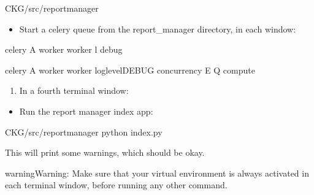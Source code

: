 \documentclass[letterpaper,10pt,english]{sphinxmanual}
\begin{document}
\begin{sphinxVerbatim}[commandchars=\\\{\}]
\PYGZdl{}  CKG/src/report\PYGZus{}manager
\end{sphinxVerbatim}
\begin{itemize}
\item {} 
Start a celery queue from the report\_manager directory, in each window:

\end{itemize}


\begin{sphinxVerbatim}[commandchars=\\\{\}]
\PYGZdl{} celery \PYGZhy{}A worker worker \PYGZhy{}l debug
\end{sphinxVerbatim}


\begin{sphinxVerbatim}[commandchars=\\\{\}]
\PYGZdl{} celery \PYGZhy{}A worker worker \PYGZhy{}\PYGZhy{}loglevelDEBUG \PYGZhy{}\PYGZhy{}concurrency \PYGZhy{}E \PYGZhy{}Q compute
\end{sphinxVerbatim}
\begin{enumerate}
%
\setcounter{enumi}{2}
\item {} 
In a fourth terminal window:

\end{enumerate}
\begin{itemize}
\item {} 
Run the report manager index app:

\end{itemize}

\begin{sphinxVerbatim}[commandchars=\\\{\}]
\PYGZdl{}  CKG/src/report\PYGZus{}manager
\PYGZdl{} python index.py
\end{sphinxVerbatim}

This will print some warnings, which should be okay.

\begin{sphinxadmonition}{warning}{Warning:}
Make sure that your virtual environment is always activated in each terminal window, before running any other command.
\end{sphinxadmonition}
\end{document}
